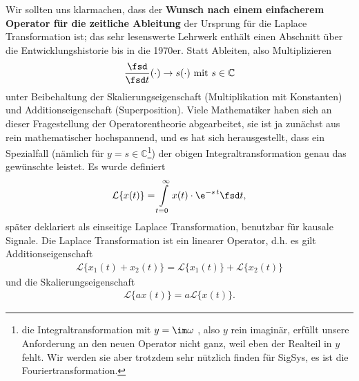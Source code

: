 Wir sollten uns klarmachen, dass der \textbf{Wunsch nach einem einfacherem Operator
für die zeitliche Ableitung} der Ursprung für die Laplace Transformation ist;
das sehr lesenswerte Lehrwerk \cite{LangeSigSys1} enthält einen Abschnitt über die
Entwicklungshistorie bis in die 1970er.
Statt Ableiten, also Multiplizieren
\begin{equation}
  \frac{\fsd }{\fsd t} (\cdot) \rightarrow s(\cdot ) \text{ mit } s \in \mathbb{C}
\end{equation}
unter Beibehaltung der Skalierungseigenschaft (Multiplikation mit Konstanten)
und Additionseigenschaft (Superposition).
%
Viele Mathematiker haben sich an dieser Fragestellung der Operatorentheorie
abgearbeitet, sie ist ja zunächst aus rein mathematischer hochspannend, und
es hat sich herausgestellt, dass ein Spezialfall
(nämlich für $y=s\in\mathbb{C}$\footnote{die Integraltransformation mit $y=\im\omega$
, also $y$ rein imaginär, erfüllt unsere Anforderung an den neuen Operator nicht ganz,
weil eben der Realteil in $y$ fehlt. Wir werden sie aber trotzdem sehr nützlich finden
für SigSys, es ist die Fouriertransformation.})
der obigen
Integraltransformation genau das gewünschte leistet. Es wurde definiert
\begin{align}
\mathcal{L}\{x(t)\} = \int\limits_{t=0}^{\infty} x(t) \cdot \e^{-s\,t} \fsd t,
\end{align}
später deklariert als einseitige Laplace Transformation, benutzbar
für kausale Signale.
%
Die Laplace Transformation ist ein linearer Operator, d.h.
es gilt Additionseigenschaft
\begin{align}
\mathcal{L}\{x_1(t)+x_2(t)\} = \mathcal{L}\{x_1(t)\} + \mathcal{L}\{x_2(t)\}
\end{align}
und die Skalierungseigenschaft
\begin{align}
\mathcal{L}\{a x(t)\} = a \mathcal{L}\{x(t)\}.
\end{align}

